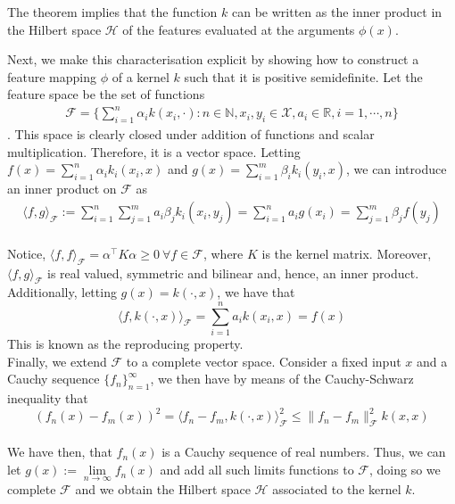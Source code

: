 The theorem implies that the function $k$ can be written as the inner product in the Hilbert space $\mathcal{H}$ of the features evaluated at the arguments $\phi(x)$.

Next, we make this characterisation explicit by showing how to construct a feature mapping $\phi$ of a kernel $k$ such that it is positive semidefinite.
Let the feature space be the set of functions 
\\
$$ 
\begin{aligned}
    \mathcal{F} =\bigg\{ \sum\limits_{i=1}^n \alpha_i k(x_i, \cdot): n \in \mathbb{N}, x_i, y_i \in \mathcal{X}, a_i \in \mathbb{R}, i=1,\cdots, n \bigg\}    
\end{aligned}
$$.
This space is clearly closed under addition of functions and scalar multiplication. Therefore, it is a vector space.
Letting $f(x)=\sum\limits_{i=1}^n \alpha_i k_i(x_i,x)$ and $g(x)=\sum\limits_{i=1}^m \beta_i k_i(y_i,x)$,  we can introduce an inner product on $\mathcal{F}$ as 
\\
$$
\begin{aligned}
    \langle f,g \rangle_{\mathcal{F}}:=\sum\limits_{i=1}^n\sum\limits_{j=1}^m a_i \beta_j k_i(x_i,y_j)=\sum\limits_{i=1}^n a_i g(x_i)= \sum\limits_{j=1}^m \beta_j f(y_j)
\end{aligned}
$$
\\
Notice, $\langle f, f \rangle_{\mathcal{F}}= \alpha^\intercal K \alpha \geq 0 \ \forall f \in \mathcal{F}$, where $K$ is the kernel matrix.
Moreover, $\langle f, g \rangle_{\mathcal{F}}$ is real valued, symmetric and bilinear and, hence, an inner product.
\\
Additionally, letting $g(x)=k(\cdot, x)$, we have that 
\begin{equation}
    \langle f, k(\cdot, x)\rangle_{\mathcal{F}}=\sum\limits_{i=1}^n a_i k(x_i,x)=f(x)    
\end{equation}
This is known as the reproducing property.
\\
Finally, we extend $\mathcal{F}$ to a complete vector space.
Consider a fixed input $x$ and a Cauchy sequence $\{f_n\}_{n=1}^{\infty}$, we then have by means of the Cauchy-Schwarz inequality that 
\\
\begin{equation}
    (f_n(x)- f_m(x))^2=\langle f_n-f_m, k(\cdot, x)\rangle_{\mathcal{F}}^2 \leq \| f_n - f_m \|_{\mathcal{F}}^2 k(x,x)    
\end{equation}
\\
We have then, that $f_n(x)$ is a Cauchy sequence of real numbers. Thus, we can let $g(x):=\underset{n\to \infty}\lim f_n(x)$ and add all such limits functions to $\mathcal{F}$, doing so we complete $\mathcal{F}$ and we obtain the Hilbert space $\mathcal{H}$ associated to the kernel $k$.

